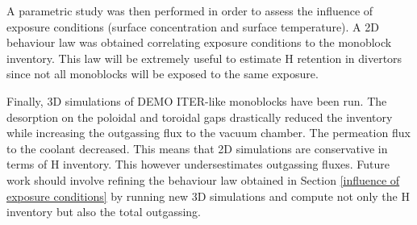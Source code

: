 A parametric study was then performed in order to assess the influence of exposure conditions (surface concentration and surface temperature).
A 2D behaviour law was obtained correlating exposure conditions to the monoblock inventory.
This law will be extremely useful to estimate H retention in divertors since not all monoblocks will be exposed to the same exposure.

Finally, 3D simulations of DEMO ITER-like monoblocks have been run.
The desorption on the poloidal and toroidal gaps drastically reduced the inventory while increasing the outgassing flux to the vacuum chamber.
The permeation flux to the coolant decreased.
This means that 2D simulations are conservative in terms of H inventory.
This however undersestimates outgassing fluxes.
Future work should involve refining the behaviour law obtained in Section \ref{influence of exposure conditions} by running new 3D simulations and compute not only the H inventory but also the total outgassing.
